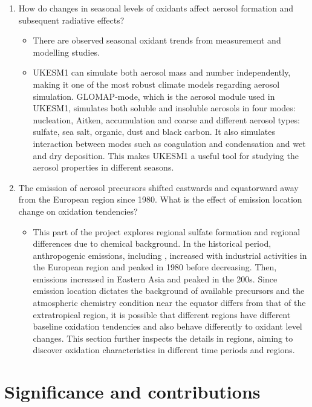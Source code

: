 \begin{enumerate}
    \item How do changes in seasonal levels of oxidants affect aerosol formation and subsequent radiative effects?

    \begin{itemize}
        \item There are observed seasonal oxidant trends from measurement and modelling studies.
        \item UKESM1 can simulate both aerosol mass and number independently, making it one of the most robust climate models regarding aerosol simulation. GLOMAP-mode, which is the aerosol module used in UKESM1, simulates both soluble and insoluble aerosols in four modes: nucleation, Aitken, accumulation and coarse and different aerosol types: sulfate, sea salt, organic, dust and black carbon. It also simulates interaction between modes such as coagulation and condensation and wet and dry deposition. This makes UKESM1 a useful tool for studying the aerosol properties in different seasons.
    \end{itemize}

    \item The emission of aerosol precursors shifted eastwards and equatorward away from the European region since 1980. What is the effect of emission location change on oxidation tendencies?

    \begin{itemize}
        \item This part of the project explores regional sulfate formation and regional differences due to chemical background. In the historical period, anthropogenic emissions, including , increased with industrial activities in the European region and peaked in 1980 before decreasing. Then, emissions increased in Eastern Asia and peaked in the 200s. Since  emission location dictates the background of available precursors and the atmospheric chemistry condition near the equator differs from that of the extratropical region, it is possible that different regions have different baseline oxidation tendencies and also behave differently to oxidant level changes. This section further inspects the details in regions, aiming to discover oxidation characteristics in different time periods and regions.  
    \end{itemize}
    
\end{enumerate}

\section{Significance and contributions}


